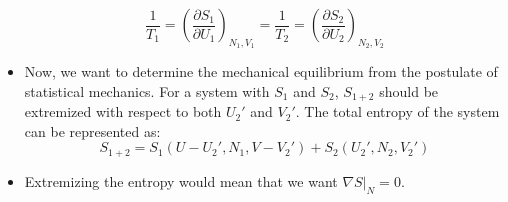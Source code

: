 \documentclass[12pt, letterpaper, twoside]{article}
\begin{document}
\begin{itemize}
\begin{equation*}
        \frac{1}{T_1} = (\frac{\partial S_1}{\partial U_1})_{N_1,V_1} = \frac{1}{T_2} = (\frac{\partial S_2}{\partial U_2})_{N_2,V_2}
    \end{equation*}
    \item Now, we want to determine the mechanical equilibrium from the postulate of statistical mechanics. For a system with $S_1$ and $S_2$, $S_{1+2}$ should be extremized with respect to both $U_2'$ and $V_2'$. The total entropy of the system can be represented as:
    \begin{equation*}
        S_{1+2} = S_1(U - U_2', N_1, V - V_2') + S_2(U_2', N_2, V_2')
    \end{equation*}
    \item Extremizing the entropy would mean that we want $\nabla S|_{N}= 0$.
\end{itemize}
\end{document}
